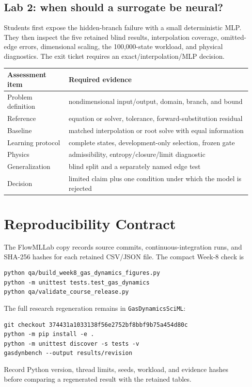 \documentclass[11pt]{article}
\begin{document}
\subsection{Lab 2: when should a surrogate be neural?}
Students first expose the hidden-branch failure with a small deterministic MLP.
They then inspect the five retained blind results, interpolation coverage,
omitted-edge errors, dimensional scaling, the 100,000-state workload, and
physical diagnostics. The exit ticket requires an exact/interpolation/MLP decision.

\begin{center}
\begin{tabular}{p{}p{}}
\toprule
Assessment item & Required evidence \\
\midrule
Problem definition & nondimensional input/output, domain, branch, and bound \\
Reference & equation or solver, tolerance, forward-substitution residual \\
Baseline & matched interpolation or root solve with equal information \\
Learning protocol & complete states, development-only selection, frozen gate \\
Physics & admissibility, entropy/closure/limit diagnostic \\
Generalization & blind split and a separately named edge test \\
Decision & limited claim plus one condition under which the model is rejected \\
\bottomrule
\end{tabular}
\end{center}

\section{Reproducibility Contract}
The FlowMLLab copy records source commits, continuous-integration runs, and
SHA-256 hashes for each retained CSV/JSON file. The compact Week-8 check is
\begin{verbatim}
python qa/build_week8_gas_dynamics_figures.py
python -m unittest tests.test_gas_dynamics
python qa/validate_course_release.py
\end{verbatim}
The full research regeneration remains in \texttt{GasDynamicsSciML}:
\begin{verbatim}
git checkout 374431a1033138f56e2752bf8bbf9b75a454d80c
python -m pip install -e .
python -m unittest discover -s tests -v
gasdynbench --output results/revision
\end{verbatim}
Record Python version, thread limits, seeds, workload, and evidence hashes before
comparing a regenerated result with the retained tables.
\end{document}
